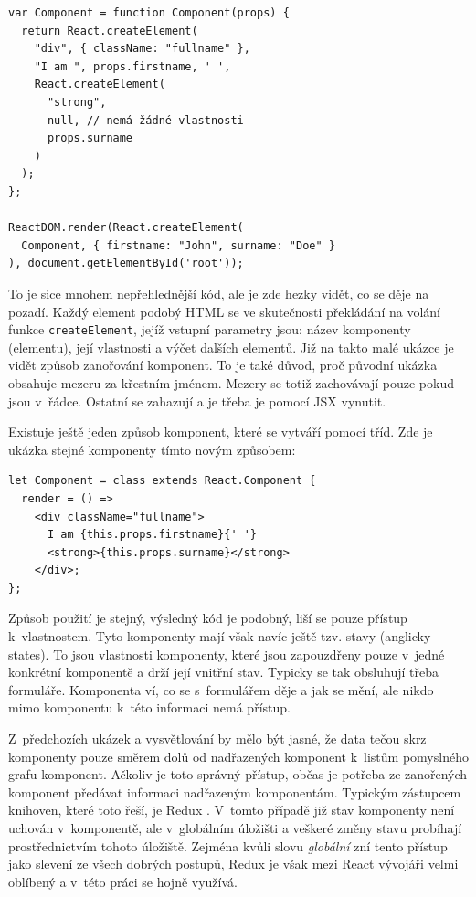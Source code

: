 \begin{verbatim}
var Component = function Component(props) {
  return React.createElement(
    "div", { className: "fullname" },
    "I am ", props.firstname, ' ',
    React.createElement(
      "strong",
      null, // nemá žádné vlastnosti
      props.surname
    )
  );
};

ReactDOM.render(React.createElement(
  Component, { firstname: "John", surname: "Doe" }
), document.getElementById('root'));
\end{verbatim}

To je sice mnohem nepřehlednější kód, ale je zde hezky vidět, co se děje na pozadí. Každý element podobý HTML se ve skutečnosti překládání na volání funkce \texttt{createElement}, jejíž vstupní parametry jsou: název komponenty (elementu), její vlastnosti a výčet dalších elementů. Již na takto malé ukázce je vidět způsob zanořování komponent. To je také důvod, proč původní ukázka obsahuje mezeru za křestním jménem. Mezery se totiž zachovávají pouze pokud jsou v~řádce. Ostatní se zahazují a je třeba je pomocí JSX vynutit.

Existuje ještě jeden způsob komponent, které se vytváří pomocí tříd. Zde je ukázka stejné komponenty tímto novým způsobem:

\begin{verbatim}
let Component = class extends React.Component {
  render = () =>
    <div className="fullname">
      I am {this.props.firstname}{' '}
      <strong>{this.props.surname}</strong>
    </div>;
};
\end{verbatim}

Způsob použití je stejný, výsledný kód je podobný, liší se pouze přístup k~vlastnostem. Tyto komponenty mají však navíc ještě tzv. stavy (anglicky states). To jsou vlastnosti komponenty, které jsou zapouzdřeny pouze v~jedné konkrétní komponentě a drží její vnitřní stav. Typicky se tak obsluhují třeba formuláře. Komponenta ví, co se s~formulářem děje a jak se mění, ale nikdo mimo komponentu k~této informaci nemá přístup.

Z~předchozích ukázek a vysvětlování by mělo být jasné, že data tečou skrz komponenty pouze směrem dolů od nadřazených komponent k~listům pomyslného grafu komponent. Ačkoliv je toto správný přístup, občas je potřeba ze zanořených komponent předávat informaci nadřazeným komponentám. Typickým zástupcem knihoven, které toto řeší, je Redux \cite{redux}. V~tomto případě již stav komponenty není uchován v~komponentě, ale v~globálním úložišti a veškeré změny stavu probíhají prostřednictvím tohoto úložiště. Zejména kvůli slovu \textit{globální} zní tento přístup jako slevení ze všech dobrých postupů, Redux je však mezi React vývojáři velmi oblíbený a v~této práci se hojně využívá.

